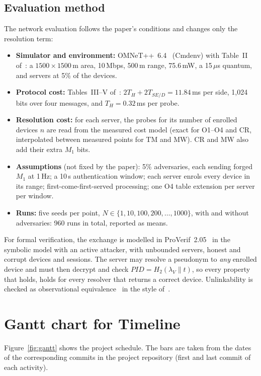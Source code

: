 \subsection*{Evaluation method}
The network evaluation follows the paper's conditions and changes only the resolution term:
\begin{itemize}
\item \textbf{Simulator and environment:} OMNeT++~6.4~\cite{omnet} (Cmdenv) with Table~II of~\cite{base}: a $1500\times1500$\,m area, 10\,Mbps, 500\,m range, 75.6\,mW, a 15\,$\mu$s quantum, and servers at 5\% of the devices.
\item \textbf{Protocol cost:} Tables~III--V of~\cite{base}: $2T_H+2T_{SE/D}=11.84$\,ms per side, 1,024 bits over four messages, and $T_H=0.32$\,ms per probe.
\item \textbf{Resolution cost:} for each server, the probes for its number of enrolled devices $n$ are read from the measured cost model (exact for O1--O4 and CR, interpolated between measured points for TM and MW). CR and MW also add their extra $M_1$ bits.
\item \textbf{Assumptions} (not fixed by the paper): 5\% adversaries, each sending forged $M_1$ at 1\,Hz; a 10\,s authentication window; each server enrols every device in its range; first-come-first-served processing; one O4 table extension per server per window.
\item \textbf{Runs:} five seeds per point, $N\in\{1,10,100,200,\dots,1000\}$, with and without adversaries: 960 runs in total, reported as means.
\end{itemize}
For formal verification, the exchange is modelled in ProVerif~2.05~\cite{proverif} in the symbolic model with an active attacker, with unbounded servers, honest and corrupt devices and sessions. The server may resolve a pseudonym to \emph{any} enrolled device and must then decrypt and check $PID=H_2(\lambda_V\|t)$, so every property that holds, holds for every resolver that returns a correct device. Unlinkability is checked as observational equivalence~\cite{blanchet08} in the style of~\cite{arapinis}.

\section{Gantt chart for Timeline}\label{sec:gantt}
Figure~\ref{fig:gantt} shows the project schedule. The bars are taken from the dates of the corresponding commits in the project repository (first and last commit of each activity). 

